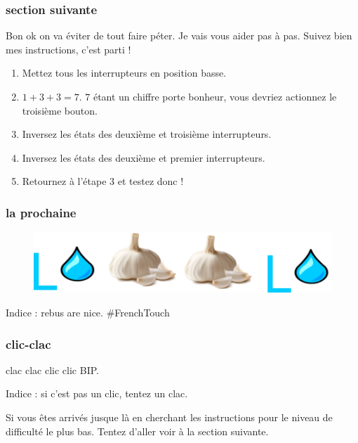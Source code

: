 \subsubsection{section suivante}
Bon ok on va éviter de tout faire péter. Je vais vous aider pas à pas. Suivez
bien mes instructions, c'est parti !
\begin{enumerate}
  \item Mettez tous les interrupteurs en position basse.
  \item $1 + 3 + 3 = 7$. $7$ étant un chiffre porte bonheur, vous devriez
        actionnez le troisième bouton.
  \item Inversez les états des deuxième et troisième interrupteurs.
  \item Inversez les états des deuxième et premier interrupteurs.
  \item Retournez à l'étape 3 et testez donc !
\end{enumerate}

\subsubsection{la prochaine}
\begin{figure}[H]
  \centering
  \includegraphics[width=.8\textwidth]{img/rebus}\hfill
\end{figure}

Indice : rebus are nice. \#FrenchTouch

\subsubsection{clic-clac}
\begin{center}
  clac clac clic clic BIP.
\end{center}
Indice : si c'est pas un clic, tentez un clac.

Si vous êtes arrivés jusque là en cherchant les instructions pour le niveau de
difficulté le plus bas. Tentez d'aller voir à la section suivante.
\newpage
